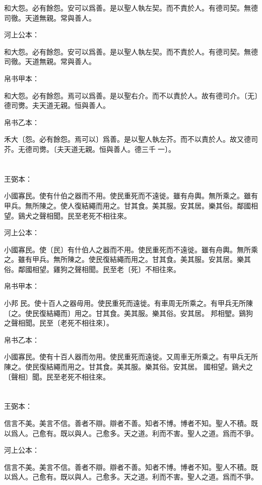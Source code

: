 \documentclass[a5paper]{ctexbook}
\begin{document}
    和大怨。必有餘怨。安可以爲善。是以聖人執左契。而不責於人。有德司契。無德司徹。天道無親。常與善人。

    河上公本：

    和大怨。必有餘怨。安可以爲善。是以聖人執左契。而不責於人。有德司契。無德司徹。天道無親。常與善人。

    帛书甲本：

    和大怨。必有餘怨。焉可以爲善。是以聖右介。而不以責於人。故有德司介。〔无〕德司勶。夫天道无親。恒與善人。

    帛书乙本：

    禾大〔怨。必有餘怨。焉可以〕爲善。是以聖人執左芥。而不以責於人。故又德司芥。无德司勶。〔夫天道无親。恒與善人。德三千𠦜一〕。

    \chapter{}
    王弼本：

    小國寡民。使有什伯之器而不用。使民重死而不遠徙。雖有舟輿。無所乘之。雖有甲兵。無所陳之。使人復結繩而用之。甘其食。美其服。安其居。樂其俗。鄰國相望。鷄犬之聲相聞。民至老死不相往來。

    河上公本：

    小國寡民。使〔民〕有什伯人之器而不用。使民重死而不遠徙。雖有舟輿。無所乘之。雖有甲兵。無所陳之。使民復結繩而用之。甘其食。美其服。安其居。樂其俗。鄰國相望。雞狗之聲相聞。民至老〔死〕不相往來。

    帛书甲本：

    小邦󱁈民。使十百人之器毋用。使民重死而遠徙。有車周无所乘之。有甲兵无所陳〔之。使民復結繩而〕用之。甘其食。美其服。樂其俗。安其居。󱁉邦相朢。鷄狗之聲相聞。民至〔老死不相往來〕。

    帛书乙本：

    小國寡民。使有十百人器而勿用。使民重死而遠徙。又周車无所乘之。有甲兵无所陳之。使民復結繩而用之。甘其食。美其服。樂其俗。安其居。𠳵國相望。鷄犬之〔聲相〕聞。民至老死不相往來。

    \chapter{}
    王弼本：

    信言不美。美言不信。善者不辯。辯者不善。知者不博。博者不知。聖人不積。既以爲人。己愈有。既以與人。己愈多。天之道。利而不害。聖人之道。爲而不爭。

    河上公本：

    信言不美。美言不信。善者不辯。辯者不善。知者不博。博者不知。聖人不積。既以爲人。己愈有。既以與人。己愈多。天之道。利而不害。聖人之道。爲而不爭。
\end{document}
